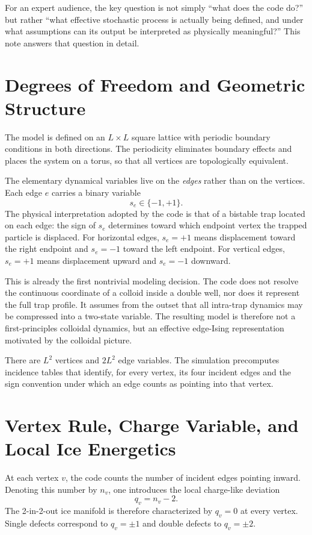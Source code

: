 \documentclass[11pt]{article}
\begin{document}
For an expert audience, the key question is not simply ``what does the code
do?'' but rather ``what effective stochastic process is actually being defined,
and under what assumptions can its output be interpreted as physically
meaningful?'' This note answers that question in detail.

\section{Degrees of Freedom and Geometric Structure}

The model is defined on an $L \times L$ square lattice with periodic boundary
conditions in both directions. The periodicity eliminates boundary effects and
places the system on a torus, so that all vertices are topologically
equivalent.

The elementary dynamical variables live on the \emph{edges} rather than on the
vertices. Each edge $e$ carries a binary variable
\[
  s_e \in \{-1,+1\}.
\]
The physical interpretation adopted by the code is that of a bistable trap
located on each edge: the sign of $s_e$ determines toward which endpoint vertex
the trapped particle is displaced. For horizontal edges, $s_e=+1$ means
displacement toward the right endpoint and $s_e=-1$ toward the left endpoint.
For vertical edges, $s_e=+1$ means displacement upward and $s_e=-1$ downward.

This is already the first nontrivial modeling decision. The code does not
resolve the continuous coordinate of a colloid inside a double well, nor does it
represent the full trap profile. It assumes from the outset that all
intra-trap dynamics may be compressed into a two-state variable. The resulting
model is therefore not a first-principles colloidal dynamics, but an effective
edge-Ising representation motivated by the colloidal picture.

There are $L^2$ vertices and $2L^2$ edge variables. The simulation precomputes
incidence tables that identify, for every vertex, its four incident edges and
the sign convention under which an edge counts as pointing into that vertex.

\section{Vertex Rule, Charge Variable, and Local Ice Energetics}

At each vertex $v$, the code counts the number of incident edges pointing
inward. Denoting this number by $n_v$, one introduces the local charge-like
deviation
\[
  q_v = n_v - 2.
\]
The 2-in-2-out ice manifold is therefore characterized by $q_v=0$ at every
vertex. Single defects correspond to $q_v=\pm1$ and double defects to
$q_v=\pm2$.
\end{document}
